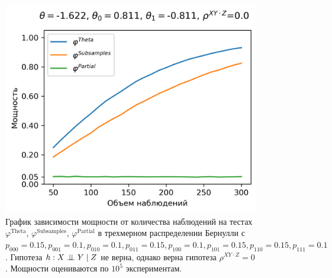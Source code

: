 \begin{figure}[H]
    \centering
    \includegraphics[scale=0.6]{images/graph4.png}
    \caption{График зависимости мощности от количества наблюдений
    на тестах $\varphi^{\text{Theta}}$, $\varphi^{\text{Subsamples}}$, $\varphi^{\text{Partial}}$
    в трехмерном распределении Бернулли с $p_{000}=0.15, p_{001}=0.1, 
    p_{010}=0.1, p_{011}=0.15,
    p_{100}=0.1, p_{101}=0.15, p_{110}=0.15, p_{111}=0.1$. 
    Гипотеза $h: X \perp\!\!\!\perp Y \mid Z$ не верна, однако верна гипотеза $\rho^{XY\cdot Z}=0$.
    Мощности оцениваются по $10^5$ экспериментам.} \label{fig:4}
\end{figure}

